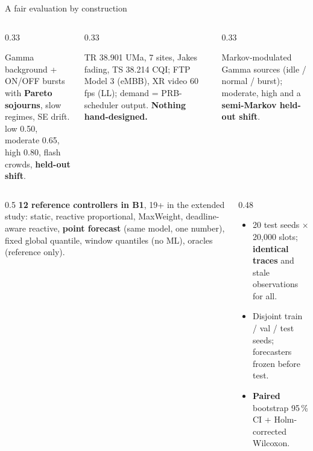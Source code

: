 \documentclass[aspectratio=169,10pt,xcolor={table,dvipsnames}]{beamer}
\begin{document}
\begin{frame}{A fair evaluation by construction}
\begin{columns}[T]
\begin{column}{0.33\textwidth}
\begin{tcolorbox}[enhanced,colback=iitblue!5,colframe=iitblue,boxrule=0.6pt,arc=3pt,title={\faRandom\ \ Family S: synthetic, bursty},fonttitle=\footnotesize\bfseries,colbacktitle=iitblue,height=2.9cm]
\scriptsize Gamma background + ON/OFF bursts with \textbf{Pareto sojourns}, slow regimes, SE drift.\\[3pt]
low 0.50, moderate 0.65, high 0.80, flash crowds, \textbf{held-out shift}.
\end{tcolorbox}
\end{column}
\begin{column}{0.33\textwidth}
\begin{tcolorbox}[enhanced,colback=good!5,colframe=good,boxrule=0.6pt,arc=3pt,title={\faBroadcastTower\ \ Family G: 3GPP},fonttitle=\footnotesize\bfseries,colbacktitle=good,height=2.9cm]
\scriptsize TR 38.901 UMa, 7 sites, Jakes fading, TS 38.214 CQI; FTP Model 3 (eMBB), XR video 60\,fps (LL); demand = PRB-scheduler output. \textbf{Nothing hand-designed.}
\end{tcolorbox}
\end{column}
\begin{column}{0.33\textwidth}
\begin{tcolorbox}[enhanced,colback=accent!5,colframe=accent,boxrule=0.6pt,arc=3pt,title={\faProjectDiagram\ \ Family M: Markov},fonttitle=\footnotesize\bfseries,colbacktitle=accent,height=2.9cm]
\scriptsize Markov-modulated Gamma sources (idle / normal / burst); moderate, high and a \textbf{semi-Markov held-out shift}.
\end{tcolorbox}
\end{column}
\end{columns}
\vspace{0.9em}
\begin{columns}[T]
\begin{column}{0.5\textwidth}
\footnotesize
\textbf{12 reference controllers in B1}, 19+ in the extended study: static, reactive proportional, MaxWeight, deadline-aware reactive, \textbf{point forecast} (same model, one number), fixed global quantile, window quantiles (no ML), oracles (reference only).
\end{column}
\begin{column}{0.48\textwidth}
\footnotesize
\begin{itemize}
  \item 20 test seeds $\times$ 20{,}000 slots; \textbf{identical traces} and stale observations for all.
  \item Disjoint train / val / test seeds; forecasters frozen before test.
  \item \textbf{Paired} bootstrap 95\,\% CI + Holm-corrected Wilcoxon.
\end{itemize}
\end{column}
\end{columns}
\end{frame}
\end{document}
